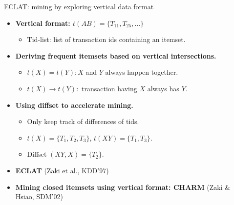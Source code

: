 \documentclass[aspectratio=169,t,xcolor=dvipsnames]{beamer}
\begin{document}
  {
    \begin{frame}{ECLAT: mining by exploring vertical data format}
        \begin{itemize}
            \item \textbf{Vertical format: $t(AB) = \{T_{11},T_{25},\ldots\}$}
            \begin{itemize}
              \item Tid-list: list of transaction ids containing an itemset.
            \end{itemize}
            \item \textbf{Deriving frequent itemsets based on vertical intersections.}
            \begin{itemize}
              \item $t(X) = t(Y): X$ and $Y$ always happen together.
              \item $t(X) \rightarrow t(Y):$ transaction having $X$ always has $Y$.
            \end{itemize}
            \item \textbf{Using diffset to accelerate mining.}
            \begin{itemize}
              \item Only keep track of differences of tids.
              \item $t(X) = \{T_1,T_2,T_3\}$, $t(XY) = \{T_1,T_3\}$.
              \item Diffset $(XY,X) = \{T_2\}$.
            \end{itemize}
            \item \textbf{ECLAT} (Zaki et al., KDD'97)
            \item \textbf{Mining closed itemsets using vertical format: CHARM} (Zaki \& Hsiao, SDM'02)
        \end{itemize}
    \end{frame}
  }
\end{document}
